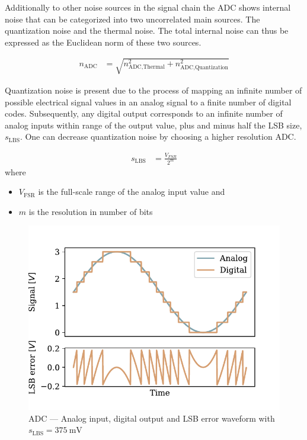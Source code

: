 Additionally to other noise sources in the signal chain the \ac{ADC} shows internal noise that can be categorized into two uncorrelated main sources. The quantization noise and the thermal noise. The total internal noise can thus be expressed as the Euclidean norm of these two sources.

\begin{align}
  n_\text{ADC} &= \sqrt{n_{\text{ADC},\text{Thermal}}^2 + n_{\text{ADC},\text{Quantization}}^2}
\end{align}

Quantization noise is present due to the process of mapping an infinite number of possible electrical signal values in an analog signal to a finite number of digital codes. Subsequently, any digital output corresponds to an infinite number of analog inputs within range of the output value, plus and minus half the \ac{LSB} size, $s_\text{LBS}$. One can decrease quantization noise by choosing a higher resolution \ac{ADC}.

\begin{align}
  s_\text{LBS} &= \frac{V_{FSR}}{2^m}
\end{align}
where
\begin{itemize}
  \item $V_{\text{FSR}}$ is the full-scale range of the analog input value and
  \item $m$ is the resolution in number of bits
\end{itemize}

\begin{figure}[!htb]
  \centering
  \includegraphics[scale=0.72]{figures/electronics/adc/plot_lsberr}
  \caption[ADC LSB waveform]{\ac{ADC} --- Analog input, digital output and \ac{LSB} error waveform with $s_\text{LBS} = \SI{375}{\milli\volt}$\cite{hall2020fund}%
    \label{fig:plot_lsberr}}
\end{figure}

